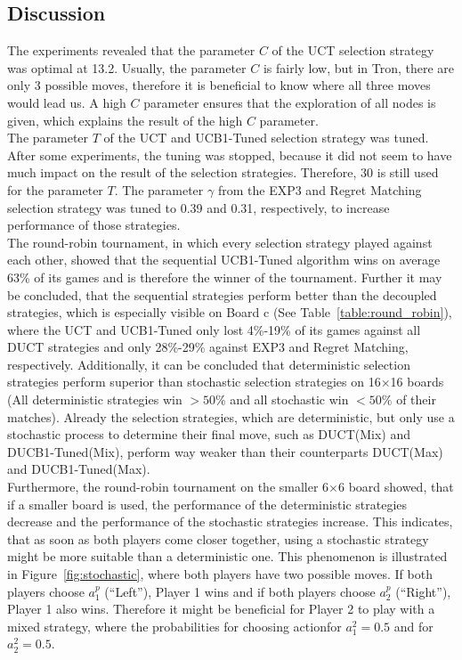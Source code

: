 \documentclass{article}
\begin{document}
\subsection{Discussion}
\label{subsec:discussion}

The experiments revealed that the parameter $C$ of the UCT selection strategy was optimal at 13.2. Usually, the parameter $C$ is fairly low, but in Tron, there are only 3 possible moves, therefore it is beneficial to know where all three moves would lead us. A high $C$ parameter ensures that the exploration of all nodes is given, which explains the result of the high $C$ parameter.\\
The parameter $T$ of the UCT and UCB1-Tuned selection strategy was tuned. After some experiments, the tuning was stopped, because it did not seem to have much impact on the result of the selection strategies. Therefore, 30 is still used for the parameter $T$. The parameter $\gamma$ from the EXP3 and Regret Matching selection strategy was tuned to 0.39 and 0.31, respectively, to increase performance of those strategies.\\
The round-robin tournament, in which every selection strategy played against each other, showed that the sequential UCB1-Tuned algorithm wins on average 63\% of its games and is therefore the winner of the tournament. Further it may be concluded, that the sequential strategies perform better than the decoupled strategies, which is especially visible on Board c (See Table~\ref{table:round_robin}), where the UCT and UCB1-Tuned only lost 4\%-19\% of its games against all DUCT strategies and only 28\%-29\% against EXP3 and Regret Matching, respectively. Additionally, it can be concluded that deterministic selection strategies perform superior than stochastic selection strategies on 16$\times$16 boards (All deterministic strategies win $>50\%$ and all stochastic win $<50\%$ of their matches). Already the selection strategies, which are deterministic, but only use a stochastic process to determine their final move, such as DUCT(Mix) and DUCB1-Tuned(Mix), perform way weaker than their counterparts DUCT(Max) and DUCB1-Tuned(Max).\\
Furthermore, the round-robin tournament on the smaller 6$\times$6 board showed, that if a smaller board is used, the performance of the deterministic strategies decrease and the performance of the stochastic strategies increase. This indicates, that as soon as both players come closer together, using a stochastic strategy might be more suitable than a deterministic one. This phenomenon is illustrated in Figure~\ref{fig:stochastic}, where both players have two possible moves. If both players choose $a^{p}_{1}$ (``Left''), Player 1 wins and if both players choose $a^{p}_{2}$ (``Right''), Player 1 also wins. Therefore it might be beneficial for Player 2 to play with a mixed strategy, where the probabilities for choosing actionfor $a^{2}_{1}=0.5$ and for $a^{2}_{2}=0.5$.
\end{document}
